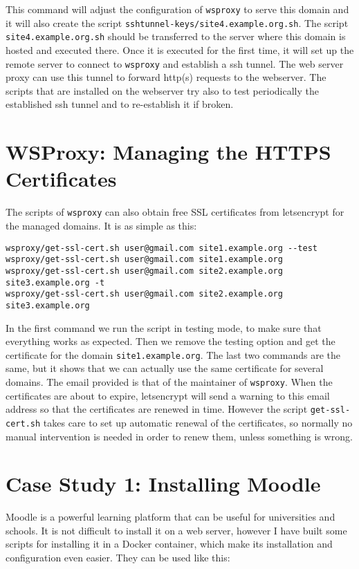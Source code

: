 \documentclass[a4paper]{article}
\begin{document}
This command will adjust the configuration of \verb/wsproxy/ to serve
this domain and it will also create the script
\verb~sshtunnel-keys/site4.example.org.sh~.  The script
\verb~site4.example.org.sh~ should be transferred to the server where
this domain is hosted and executed there. Once it is executed for the
first time, it will set up the remote server to connect to
\verb/wsproxy/ and establish a ssh tunnel.  The web server proxy can
use this tunnel to forward http(s) requests to the webserver. The
scripts that are installed on the webserver try also to test
periodically the established ssh tunnel and to re-establish it if
broken.


\section{WSProxy: Managing the HTTPS Certificates}

The scripts of \verb/wsproxy/ can also obtain free SSL certificates
from letsencrypt for the managed domains. It is as simple as this:
\begin{verbatim}
wsproxy/get-ssl-cert.sh user@gmail.com site1.example.org --test
wsproxy/get-ssl-cert.sh user@gmail.com site1.example.org
wsproxy/get-ssl-cert.sh user@gmail.com site2.example.org site3.example.org -t
wsproxy/get-ssl-cert.sh user@gmail.com site2.example.org site3.example.org
\end{verbatim}

In the first command we run the script in testing mode, to make sure
that everything works as expected. Then we remove the testing option
and get the certificate for the domain \verb/site1.example.org/. The
last two commands are the same, but it shows that we can actually use
the same certificate for several domains. The email provided is that
of the maintainer of \verb/wsproxy/. When the certificates are about
to expire, letsencrypt will send a warning to this email address so
that the certificates are renewed in time. However the script
\verb~get-ssl-cert.sh~ takes care to set up automatic renewal of the
certificates, so normally no manual intervention is needed in order to
renew them, unless something is wrong.


\section{Case Study 1: Installing Moodle}

Moodle is a powerful learning platform that can be useful for
universities and schools. It is not difficult to install it on a web
server, however I have built some scripts for installing it in a
Docker container, which make its installation and configuration even
easier. They can be used like this:
\end{document}
